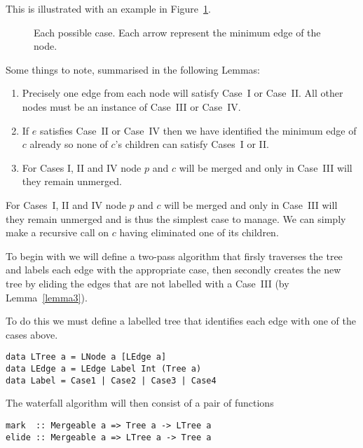 \documentclass{jfp}
\begin{document}
This is illustrated with an example in Figure~\ref{fig:cases}.

\begin{figure}
\centering
\ifpdf
\else
\fi
\caption{Each possible case. Each arrow represent the minimum edge of
the node.}
\label{fig:cases}
\end{figure}


Some things to note, summarised in the following Lemmas:
\begin{enumerate}

\item Precisely one edge from each node will satisfy Case~I or
  Case~II. All other nodes must be an instance of Case~III or Case~IV.
\label{lemma1}

\item If $e$ satisfies Case~II or Case~IV then we have identified the
  minimum edge of $c$ already so none of $c$'s children can satisfy
  Cases~I or II.
\label{lemma2}

\item For Cases I, II and IV node $p$ and $c$ will be merged and only
  in Case~III will they remain unmerged.
\label{lemma3}

\end{enumerate}

For Cases~I, II and IV node $p$ and $c$ will be merged and only in Case~III
will they remain unmerged and is thus the simplest case to manage.  We
can simply make a recursive call on $c$ having eliminated one of its
children.

To begin with we will define a two-pass algorithm that firsly
traverses the tree and labels each edge with the appropriate case,
then secondly creates the new tree by eliding the edges that are not
labelled with a Case~III (by Lemma~\ref{lemma3}).

To do this we must define a labelled tree that identifies each edge
with one of the cases above.


\begin{verbatim}
data LTree a = LNode a [LEdge a]
data LEdge a = LEdge Label Int (Tree a)
data Label = Case1 | Case2 | Case3 | Case4
\end{verbatim}

The waterfall algorithm will then consist of a pair of functions

\begin{verbatim}
mark  :: Mergeable a => Tree a -> LTree a
elide :: Mergeable a => LTree a -> Tree a
\end{verbatim}
\end{document}
